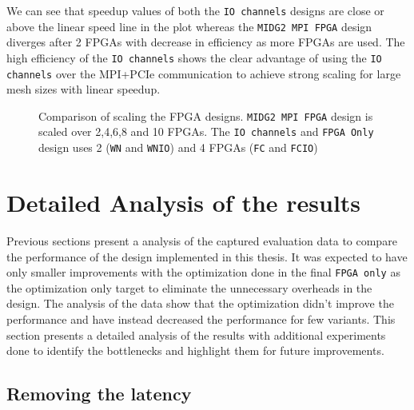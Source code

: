 We can see that speedup values of both the \texttt{IO channels} designs are close or above the
linear speed line in the plot whereas the \texttt{MIDG2 MPI FPGA} design diverges after 2 FPGAs with
decrease in efficiency as more FPGAs are used. The high efficiency of the \texttt{IO channels}
shows the clear advantage of using the \texttt{IO channels} over the MPI+PCIe communication
to achieve strong scaling for large mesh sizes with linear speedup.

\begin{figure}[h]
	\centering\small
    \scalebox{0.8}{}
    \caption{Comparison of scaling the FPGA designs. \texttt{MIDG2 MPI FPGA} design is scaled
    over 2,4,6,8 and 10 FPGAs. The \texttt{IO channels} and \texttt{FPGA Only} design uses
    2 (\texttt{WN} and \texttt{WNIO}) and 4 FPGAs (\texttt{FC} and \texttt{FCIO})}
	\label{plot:speed_gen}
\end{figure}


\section{Detailed Analysis of the results}

Previous sections present a analysis of the captured evaluation data to compare
the performance of the design implemented in this thesis. It was expected to
have only smaller improvements with the optimization done in the final
\texttt{FPGA only} as the optimization only target to eliminate the unnecessary
overheads in the design. The analysis of the data show that the optimization didn't
improve the performance and have instead decreased the performance for few variants.
This section presents a detailed analysis of the results with additional experiments
done to identify the bottlenecks and highlight them for future improvements.


\subsection{Removing the latency}

